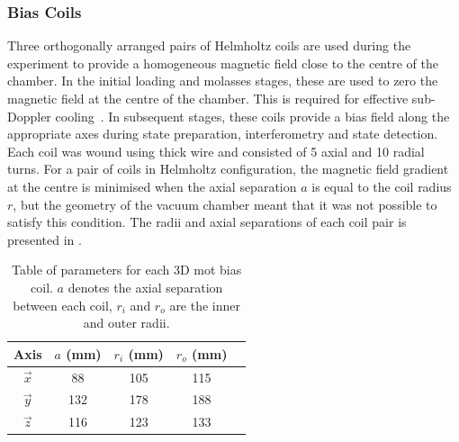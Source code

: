 \subsubsection{Bias Coils}
Three orthogonally arranged pairs of Helmholtz coils are used during the
experiment to provide a homogeneous magnetic field close to the centre of the chamber. In the initial loading and molasses stages, these are used to zero the magnetic field at the centre of the chamber. This is required for effective sub-Doppler cooling~\nocite{Walhout1992}. In subsequent stages,
these coils provide a bias field along the appropriate axes during state
preparation, interferometry and state detection. Each coil was wound using
 thick wire and consisted of 5 axial and 10 radial
turns. For a pair of coils in Helmholtz configuration, the magnetic field
gradient at the centre is minimised when the axial separation \(a\) is equal to
the coil radius \(r\), but the geometry of the vacuum chamber meant that it was
not possible to satisfy this condition. The radii and axial separations of each
coil pair is presented in .\begin{table}
	\begin{tabular}{|c|c|c|c|c|}
		\hline
		Axis        & \(a\) (mm) & \(r_i\) (mm) & \(r_o\) (mm) \\
		\hline
		\(\vec{x}\) & 88         & 105          & 115          \\
		\(\vec{y}\) & 132        & 178          & 188          \\
		\(\vec{z}\) & 116        & 123          & 133          \\
		\hline
	\end{tabular}
	\caption[Table of parameters for each 3D \ac{mot} bias coil.]{Table of
		parameters for each 3D \ac{mot} bias coil. \(a\) denotes the axial
		separation between each coil, \(r_i\) and \(r_o\) are the inner and
		outer radii.}
	\label{tab:bias_coils}
\end{table}
